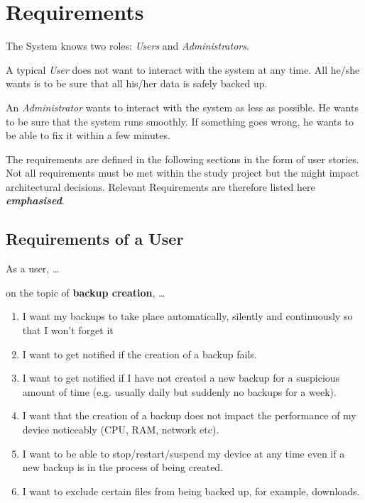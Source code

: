 \newcommand{\relevantreq}[1]{\textit{\textbf{#1}}}
\newcommand{\enumcountsave}{\setcounter{listcounter}{\value{enumi}}}
\newcommand{\enumcountrestore}{\setcounter{enumi}{\value{listcounter}}}

\section{Requirements}

The System knows two roles: \emph{Users} and \emph{Administrators}.

A typical \emph{User} does not want to interact with the system at any time.
All he/she wants is to be sure that all his/her data is safely backed
up.

An \emph{Administrator} wants to interact with the system as less as possible.
He wants to be sure that the system runs smoothly. If something goes
wrong, he wants to be able to fix it within a few minutes.


The requirements are defined in the following sections in the form of user stories.
Not all requirements must be met within the study project but the might %
impact architectural decisions. Relevant Requirements are therefore listed here \relevantreq{emphasised}.

\subsection{Requirements of a User}
As a user, \ldots{}

\begin{flushright}
on the topic of \textbf{backup creation}, \ldots{}
\end{flushright}

\begin{enumerate}
	\item	I want my backups to take place automatically, silently and continuously so that I won't forget it
	\item	I want to get notified if the creation of a backup fails.
	\item	I want to get notified if I have not created a new backup for a suspicious amount of time (e.g. usually daily but suddenly no backups for a week).
	\item	I want that the creation of a backup does not impact the performance of my device noticeably (CPU, RAM, network etc).
	\item	I want to be able to stop/restart/suspend my device at any time even if a new backup is in the process of being created.
	\item	I want to exclude certain files from being backed up, for example, downloads.
	\enumcountsave
\end{enumerate}

